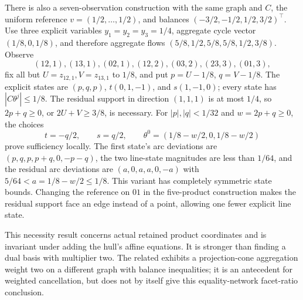\begin{remark}\label{rem:seven-product-k4}
There is also a seven-observation construction with the same graph and
$C$, the uniform reference $v=(1/2,\ldots,1/2)$, and balances
$(-3/2,-1/2,1/2,3/2)^\top$. Use three explicit variables
$y_1=y_2=y_3=1/4$, aggregate cycle vector $(1/8,0,1/8)$, and therefore
aggregate flows $(5/8,1/2,5/8,5/8,1/2,3/8)$. Observe
\[
 (12,1),(13,1),(02,1),(12,2),(03,2),(23,3),(01,3),
\]
fix all but $U=z_{12,1},V=z_{13,1}$ to $1/8$, and put
$p=U-1/8$, $q=V-1/8$. The explicit states are
$(p,q,p)$, $t(0,1,-1)$, and $s(1,-1,0)$; every state has
$|C\theta^j|\le1/8$. The residual support in direction $(1,1,1)$
is at most $1/4$, so $2p+q\ge0$, or $2U+V\ge3/8$, is necessary.
For $|p|,|q|<1/32$ and $w=2p+q\ge0$, the choices
\[
 t=-q/2,\qquad s=q/2,\qquad
 \theta^0=(1/8-w/2,0,1/8-w/2)
\]
prove sufficiency locally. The first state's arc deviations are
$(p,q,p,p+q,0,-p-q)$, the two line-state magnitudes are less than
$1/64$, and the residual arc deviations are $(a,0,a,a,0,-a)$ with
$5/64<a=1/8-w/2\le1/8$. This variant has completely symmetric state
bounds. Changing the reference on $01$ in the five-product construction
makes the residual support face an edge instead of a point, allowing
one fewer explicit line state.
\end{remark}

This necessity result concerns actual retained product coordinates and is
invariant under adding the hull's affine equations. It is stronger than
finding a dual basis with multiplier two. The related
\citet[Example~2]{KhademniaDavarnia2025} exhibits a projection-cone
aggregation weight two on a different graph with balance inequalities;
it is an antecedent for weighted cancellation, but does not by itself
give this equality-network facet-ratio conclusion.
